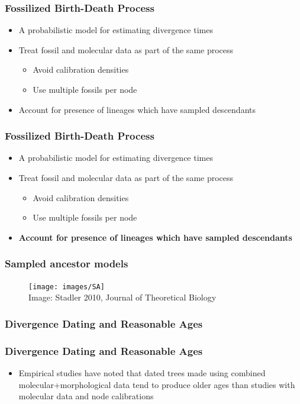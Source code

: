 \documentclass[]{beamer}
\begin{document}
\begin{frame}
\frametitle{Fossilized Birth-Death Process}
\begin{itemize}
\item A probabilistic model for estimating divergence times
\item Treat fossil and molecular data as part of the same process 
\begin{itemize}
	\item Avoid calibration densities 
	\item Use multiple fossils per node
\end{itemize}
\item Account for presence of lineages which have sampled descendants	
\end{itemize}
\end{frame}

\begin{frame}
\frametitle{Fossilized Birth-Death Process}
\begin{itemize}
\item A probabilistic model for estimating divergence times
\item Treat fossil and molecular data as part of the same process 
\begin{itemize}
	\item Avoid calibration densities 
	\item Use multiple fossils per node
\end{itemize}
\item \textbf{Account for presence of lineages which have sampled descendants}	
\end{itemize}
\end{frame}

\begin{frame}
\frametitle{Sampled ancestor models}
\begin{figure}
\texttt{[image: images/SA]} \\
Image: Stadler 2010, Journal of Theoretical Biology
\end{figure}
\end{frame}



\begin{frame}
\frametitle{Divergence Dating and Reasonable Ages}
\end{frame}

\begin{frame}
\frametitle{Divergence Dating and Reasonable Ages}
\begin{itemize}
\item Empirical studies have noted that dated trees made using combined molecular+morphological data tend to produce older ages than studies with molecular data and node calibrations
\end{itemize}
\end{frame}
\end{document}
